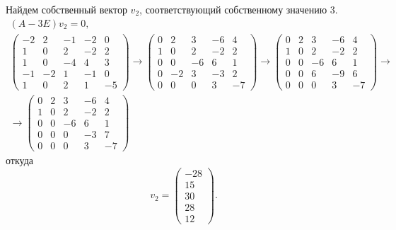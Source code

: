 \documentclass[12pt]{article}
\begin{document}
    Найдем собственный вектор $v_2$, соответствующий собственному значению 3.
    \begin{gather*}
        \left ( A - 3 E \right ) v_2 = 0, \\
        \begin{pmatrix}
            -2 & 2  & -1 & -2 & 0  \\
            1  & 0  & 2  & -2 & 2  \\
            1  & 0  & -4 & 4  & 3  \\
            -1 & -2 & 1  & -1 & 0  \\
            1  & 0  & 2  & 1  & -5
        \end{pmatrix}
        \rightarrow
        \begin{pmatrix}
            0 & 2  & 3  & -6 & 4  \\
            1 & 0  & 2  & -2 & 2  \\
            0 & 0  & -6 & 6  & 1  \\
            0 & -2 & 3  & -3 & 2  \\
            0 & 0  & 0  & 3  & -7
        \end{pmatrix}
        \rightarrow
        \begin{pmatrix}
            0 & 2 & 3  & -6 & 4  \\
            1 & 0 & 2  & -2 & 2  \\
            0 & 0 & -6 & 6  & 1  \\
            0 & 0 & 6  & -9 & 6  \\
            0 & 0 & 0  & 3  & -7
        \end{pmatrix}
        \rightarrow \\
        \rightarrow
        \begin{pmatrix}
            0 & 2 & 3  & -6 & 4  \\
            1 & 0 & 2  & -2 & 2  \\
            0 & 0 & -6 & 6  & 1  \\
            0 & 0 & 0  & -3 & 7  \\
            0 & 0 & 0  & 3  & -7
        \end{pmatrix}
    \end{gather*}
    откуда
    \[
        v_2 = \begin{pmatrix}
                  - 28 \\ 15 \\ 30 \\ 28 \\ 12
        \end{pmatrix}
        .
    \]
\end{document}
